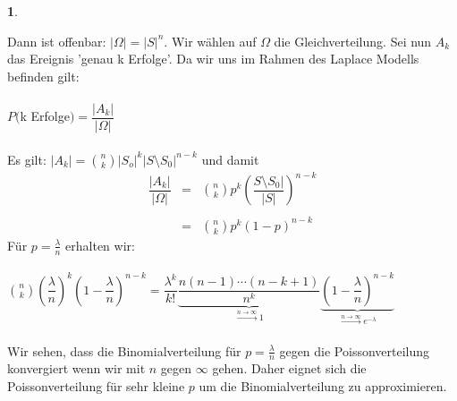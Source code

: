 \documentclass[10pt,a4paper]{report}
\numberwithin{equation}{section}
\numberwithin{figure}{section}
\theoremstyle{plain}
\theoremstyle{definition}
\theoremstyle{plain}
\theoremstyle{definition}
\newtheorem{example}{\protect\examplename}[section]
\theoremstyle{remark}
\theoremstyle{plain}
\theoremstyle{plain}
\theoremstyle{plain}
\theoremstyle{plain}
\theoremstyle{plain}
\providecommand{\examplename}{Beispiel}
\newcommand{\1}{ \mathbb{1} } %
\begin{document}
\begin{example}
\begin{itemize}
    Dann ist offenbar: $|\Omega|=|S|^n$. Wir wählen auf $\Omega$ die Gleichverteilung. Sei nun $A_k$ das Ereignis 'genau k Erfolge'. Da wir uns im Rahmen des Laplace Modells befinden gilt:\\\\
    $P($k Erfolge$)=\dfrac{|A_k|}{|\Omega|}$\\\\
    Es gilt: $|A_k|=\binom{n}{k}|S_o|^k|S\setminus S_0|^{n-k}$ und
    damit
    \begin{eqnarray*}
      \dfrac{|A_k|}{|\Omega|}&=&\binom{n}{k}p^k\left(\dfrac{S\setminus S_0|}{|S|}\right)^{n-k}\\\\
      &=&\binom{n}{k}p^k(1-p)^{n-k}
    \end{eqnarray*}
    Für $p=\frac{\lambda}{n}$ erhalten wir:\\\\
    $\binom{n}{k}\left(\dfrac{\lambda}{n}\right)^k\left(1-\dfrac{\lambda}{n}\right)^{n-k}=\dfrac{\lambda^k}{k!}\underbrace{\dfrac{n(n-1)\cdots(n-k+1)}{n^k}}_{\overset{n \to \infty}{\rightarrow} 1}\underbrace{\left(1-\dfrac{\lambda}{n}\right)^{n-k}}_{\overset{n \to \infty}{\rightarrow} e^{-\lambda}}$\\\\
    Wir sehen, dass die Binomialverteilung für $p=\frac{\lambda}{n}$ gegen die Poissonverteilung konvergiert wenn wir mit $n$ gegen $\infty$ gehen. Daher eignet sich die Poissonverteilung für sehr kleine $p$ um die Binomialverteilung zu approximieren.\\\\\\
  \end{itemize}
\end{example}
\end{document}
